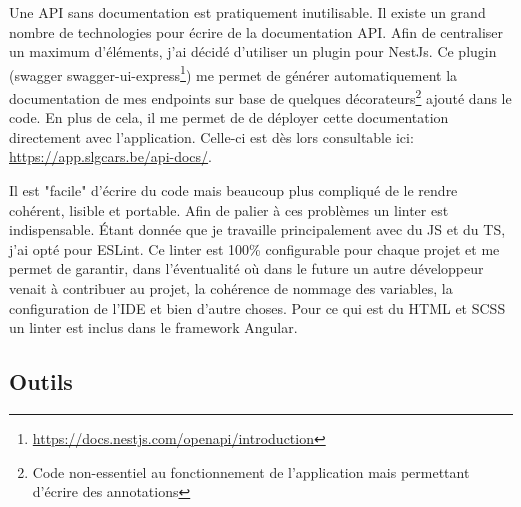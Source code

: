 \newpara

Une API sans documentation est pratiquement inutilisable. Il existe un grand nombre de technologies pour écrire de la documentation API. Afin de centraliser un maximum d'éléments, j'ai décidé d'utiliser un plugin pour NestJs. Ce plugin (swagger swagger-ui-express\footnote{\url{https://docs.nestjs.com/openapi/introduction}}) me permet de générer automatiquement la documentation de mes endpoints sur base de quelques décorateurs\footnote{Code non-essentiel au fonctionnement de l'application mais permettant d'écrire des annotations} ajouté dans le code. En plus de cela, il me permet de de déployer cette documentation directement avec l'application. Celle-ci est dès lors consultable ici:\\\url{https://app.slgcars.be/api-docs/}.


Il est "facile" d'écrire du code mais beaucoup plus compliqué de le rendre cohérent, lisible et portable. Afin de palier à ces problèmes un linter est indispensable. Étant donnée que je travaille principalement avec du JS et du TS, j'ai opté pour ESLint. Ce linter est 100\% configurable pour chaque projet et me permet de garantir, dans l'éventualité où dans le future un autre développeur venait à contribuer au projet, la cohérence de nommage des variables, la configuration de l'IDE et bien d'autre choses. Pour ce qui est du HTML et SCSS un linter est inclus dans le framework Angular.

\subsection{Outils}
